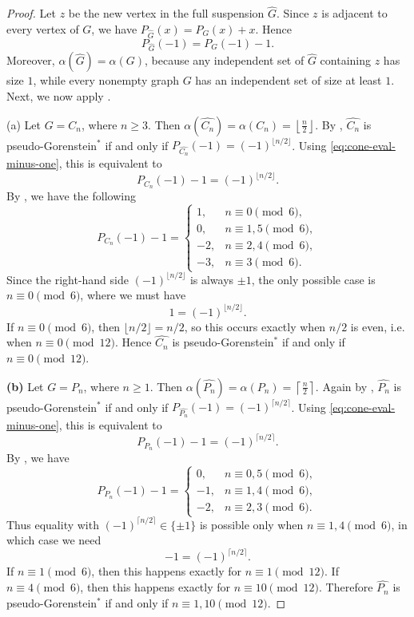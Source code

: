 \documentclass[10pt,a4paper]{amsart}
\begin{document}
\begin{proof}
Let \(z\) be the new vertex in the full suspension \(\widehat{G}\).
Since \(z\) is adjacent to every vertex of \(G\), we have \(P_{\widehat{G}}(x)=P_G(x)+x\). Hence
\begin{equation}\label{eq:cone-eval-minus-one}
P_{\widehat{G}}(-1)=P_G(-1)-1.
\end{equation}
Moreover, \(\alpha(\widehat{G})=\alpha(G)\), because any independent set of
\(\widehat{G}\) containing \(z\) has size \(1\), while every nonempty graph \(G\)
has an independent set of size at least \(1\). Next, we now apply .


(a) Let \(G=C_n\), where \(n\ge 3\). Then
 \(\alpha(\widehat{C_n})=\alpha(C_n)=\left\lfloor \frac n2\right\rfloor\). By , \(\widehat{C_n}\) is pseudo-Gorenstein\(^{*}\) if and only if
\(P_{\widehat{C_n}}(-1)=(-1)^{\lfloor n/2\rfloor}
\). Using \eqref{eq:cone-eval-minus-one}, this is equivalent to
\[
P_{C_n}(-1)-1=(-1)^{\lfloor n/2\rfloor}.
\]
By , we have the following
\[
P_{C_n}(-1)-1=
\begin{cases}
1,& n\equiv 0 \pmod 6,\\[4pt]
0,& n\equiv 1,5 \pmod 6,\\[4pt]
-2,& n\equiv 2,4 \pmod 6,\\[4pt]
-3,& n\equiv 3 \pmod 6.
\end{cases}
\]
Since the right-hand side \( (-1)^{\lfloor n/2\rfloor}\) is always \(\pm 1\), the
only possible case is \(n\equiv 0\pmod 6\), where we must have
\[
1=(-1)^{\lfloor n/2\rfloor}.
\]
If \(n\equiv 0\pmod 6\), then \(\lfloor n/2\rfloor=n/2\), so this occurs exactly
when \(n/2\) is even, i.e. when \(n\equiv 0\pmod{12}\). Hence
\(\widehat{C_n}\) is pseudo-Gorenstein\(^{*}\) if and only if \(n\equiv 0\pmod{12}\).

\smallskip
\noindent
\textbf{(b)} Let \(G=P_n\), where \(n\ge 1\). Then
 \(\alpha(\widehat{P_n})=\alpha(P_n)=\left\lceil \frac n2\right\rceil\).
Again by , \(\widehat{P_n}\) is pseudo-Gorenstein\(^{*}\)
if and only if \(P_{\widehat{P_n}}(-1)=(-1)^{\lceil n/2\rceil}\). Using \eqref{eq:cone-eval-minus-one}, this is equivalent to
\[
P_{P_n}(-1)-1=(-1)^{\lceil n/2\rceil}.
\]
By , we have
\[
P_{P_n}(-1)-1=
\begin{cases}
0,& n\equiv 0,5 \pmod 6,\\[4pt]
-1,& n\equiv 1,4 \pmod 6,\\[4pt]
-2,& n\equiv 2,3 \pmod 6.
\end{cases}
\]
Thus equality with \( (-1)^{\lceil n/2\rceil}\in\{\pm1\}\) is possible only when
\(n\equiv 1,4\pmod 6\), in which case we need
\[
-1=(-1)^{\lceil n/2\rceil}.
\]
If \(n\equiv 1\pmod 6\), then this happens exactly for \(n\equiv 1\pmod{12}\).
If \(n\equiv 4\pmod 6\), then this happens exactly for \(n\equiv 10\pmod{12}\).
Therefore \(\widehat{P_n}\) is pseudo-Gorenstein\(^{*}\) if and only if \(n\equiv 1,10 \pmod{12}\).
\end{proof}
\end{document}
